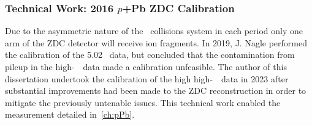 
\FloatBarrier
\subsubsection{Technical Work: 2016 \texorpdfstring{$p$}{p}+Pb ZDC Calibration}
\label{sec:zdc_calib}
Due to the asymmetric nature of the \pxPb\ collisions system in each period only one arm of the ZDC detector will receive ion fragments.
In 2019, J. Nagle performed  the calibration of the 5.02 \TeV\ data, but concluded that the contamination from pileup in the high-\avmu\ \pxPb\ data made a calibration unfeasible.
The author of this dissertation undertook the calibration of the high high-\avmu\ \pxPb\ data in 2023 after substantial improvements had been made to the ZDC reconstruction in order to mitigate the previously untenable issues.
This technical work enabled the measurement detailed in~\ref{ch:pPb}.

